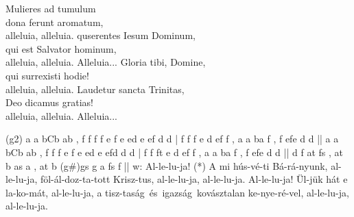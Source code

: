 \documentclass[twoside]{article}
\begin{document}
\begin{hymnstanzas}
  Mulieres ad tumulum\\
  dona ferunt aromatum,\\
  alleluia, alleluia.
\stanzabreak
  quserentes Iesum Dominum,\\
  qui est Salvator hominum,\\
  alleluia, alleluia. Alleluia...
\stanzabreak
  Gloria tibi, Domine,\\
  qui surrexisti hodie!\\
  alleluia, alleluia.
\stanzabreak
  Laudetur sancta Trinitas,\\
  Deo dicamus gratias!\\
  alleluia, alleluia. Alleluia...
\end{hymnstanzas}


\begin{aretino}
(g2) a a bCb ab , f f f f e f e ed e ef d d | f f f e d ef f , a a ba f , f efe d d || a a bCb ab , f f f e f e ed e efd d d | f f ft e d ef f , a a ba f , f efe d d || d f at fs , at b as a , at b (g#)gs g a fs f ||
w: Al-le-lu-ja! (*) A mi hús-vé-ti Bá-rá-nyunk, al-le-lu-ja, föl-ál-doz-ta-tott Krisz-tus, al-le-lu-ja, al-le-lu-ja. Al-le-lu-ja! Ül-jük hát e la-ko-mát, al-le-lu-ja, a tisz-taság~és~igazság~kovásztalan ke-nye-ré-vel, al-le-lu-ja, al-le-lu-ja.
\end{aretino}


\begin{psalmsheet}[tone=5]
\end{psalmsheet}
\end{document}
